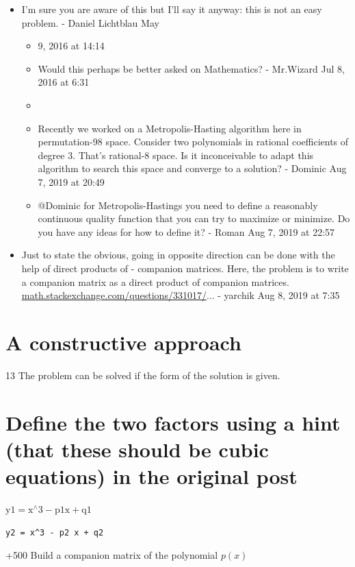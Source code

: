 \documentclass[10pt]{article}
\begin{document}
\begin{itemize}
  \item[5] I'm sure you are aware of this but I'll say it anyway: this is not an easy problem. - Daniel Lichtblau May
  \begin{itemize}
    \item[] 9, 2016 at 14:14
    \item[-] Would this perhaps be better asked on Mathematics? - Mr.Wizard Jul 8, 2016 at 6:31
    \item[F] 
    \item[-] Recently we worked on a Metropolis-Hasting algorithm here in permutation-98 space. Consider two polynomials in rational coefficients of degree 3. That's rational-8 space. Is it inconceivable to adapt this algorithm to search this space and converge to a solution? - Dominic Aug 7, 2019 at 20:49
    \item[1] @Dominic for Metropolis-Hastings you need to define a reasonably continuous quality function that you can try to maximize or minimize. Do you have any ideas for how to define it? - Roman Aug 7, 2019 at 22:57
  \end{itemize}
  \item[2] Just to state the obvious, going in opposite direction can be done with the help of direct products of - companion matrices. Here, the problem is to write a companion matrix as a direct product of companion matrices. \href{http://math.stackexchange.com/questions/331017/}{math.stackexchange.com/questions/331017/}... - yarchik Aug 8, 2019 at 7:35
\end{itemize}

\section*{A constructive approach}
13 The problem can be solved if the form of the solution is given.

\section*{Define the two factors using a hint (that these should be cubic equations) in the original post}
$\mathrm{y} 1=\mathrm{x}^{\wedge} 3-\mathrm{p} 1 \mathrm{x}+\mathrm{q} 1$

\begin{verbatim}
y2 = x^3 - p2 x + q2
\end{verbatim}

+500 Build a companion matrix of the polynomial $p(x)$
\end{document}
